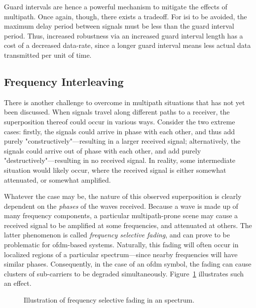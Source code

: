 \documentclass[class=report,11pt,crop=false]{standalone}
\begin{document}
Guard intervals are hence a powerful mechanism to mitigate the effects of multipath. Once again, though, there exists a tradeoff. For \gls{isi} to be avoided, the maximum delay period between signals must be less than the guard interval period. Thus, increased robustness via an increased guard interval length has a cost of a decreased data-rate, since a longer guard interval means less actual data transmitted per unit of time.

\subsection{Frequency Interleaving}
There is another challenge to overcome in multipath situations that has not yet been discussed. When signals travel along different paths to a receiver, the superposition thereof could occur in various ways. Consider the two extreme cases: firstly, the signals could arrive in phase with each other, and thus add purely "constructively"---resulting in a larger received signal; alternatively, the signals could arrive out of phase with each other, and add purely "destructively"---resulting in no received signal. In reality, some intermediate situation would likely occur, where the received signal is either somewhat attenuated, or somewhat amplified.

Whatever the case may be, the nature of this observed superposition is clearly dependent on the \emph{phases} of the waves received. Because a wave is made up of many frequency components, a particular multipath-prone scene may cause a received signal to be amplified at some frequencies, and attenuated at others. The latter phenomenon is called \emph{frequency selective fading}, and can prove to be problematic for \gls{ofdm}-based systems. Naturally, this fading will often occur in localized regions of a particular spectrum---since nearby frequencies will have similar phases. Consequently, in the case of an \gls{ofdm} symbol, the fading can cause clusters of sub-carriers to be degraded simultaneously. Figure~\ref{fig:ofdm-selective-fading} illustrates such an effect.

\begin{figure}[htbp]
    \centering
    \captionsetup{type=figure}
    \def\svgwidth{0.8\linewidth}
    { %
        }
    \caption{Illustration of frequency selective fading in an  spectrum.}
    \label{fig:ofdm-selective-fading}
\end{figure}
\end{document}
